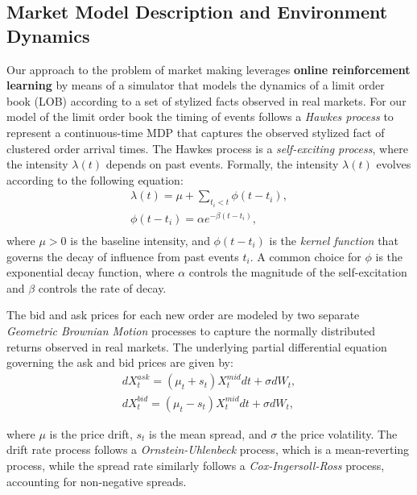 \subsection{Market Model Description and Environment Dynamics}
\label{subsec:market-model-description-and-environment-dynamics}
Our approach to the problem of market making leverages \textbf{online reinforcement learning} by means of a simulator that models the dynamics of
a limit order book (LOB) according to a set of stylized facts observed in real markets.
For our model of the limit order book the timing of events follows a \textit{Hawkes process}
to represent a continuous-time MDP that captures the observed stylized fact of clustered order arrival times.
The Hawkes process is a \textit{self-exciting process}, where the intensity \( \lambda(t) \) depends on past events.
Formally, the intensity \( \lambda(t) \) evolves according to the following equation:
\begin{gather*}
    \lambda(t) = \mu + \sum_{t_i < t} \phi(t - t_i),\\
    \phi(t - t_i) = \alpha e^{-\beta (t - t_i)},\\
\end{gather*}
where \( \mu > 0 \) is the baseline intensity, and \( \phi(t - t_i) \) is the \textit{kernel function} that governs the decay of influence from past events \( t_i \).
A common choice for \( \phi \) is the exponential decay function, where \(\alpha\) controls the magnitude of the self-excitation and \(\beta\) controls the rate of decay.
\newline

The bid and ask prices for each new order are modeled by two separate \textit{Geometric Brownian Motion} processes to capture the normally distributed returns observed in real markets.
The underlying partial differential equation governing the ask and bid prices are given by:
\begin{gather*}
    dX_{t}^{ask} = (\mu_t + s_t) X_{t}^{mid} dt + \sigma dW_t,\\
    dX_{t}^{bid} = (\mu_t - s_t) X_{t}^{mid} dt + \sigma dW_t,
\end{gather*}

where $\mu$ is the price drift, $s_t$ is the mean spread, and $\sigma$ the price volatility.
The drift rate process follows a \textit{Ornstein-Uhlenbeck} process, which is a mean-reverting process,
while the spread rate similarly follows a \textit{Cox-Ingersoll-Ross} process, accounting for non-negative spreads.

